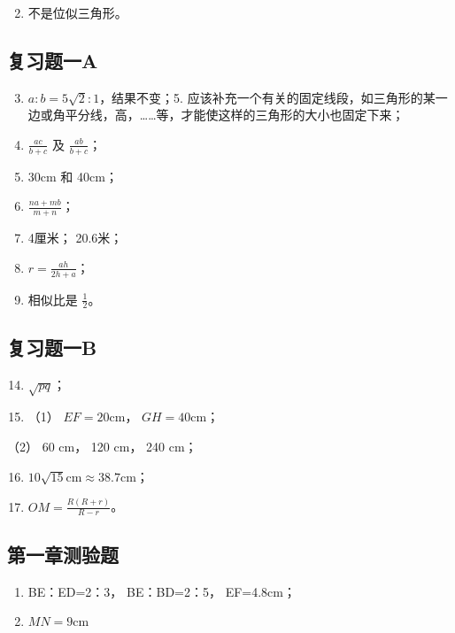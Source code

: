 \begin{enumerate}
\setcounter{enumi}{1}
\item
  不是位似三角形。
\end{enumerate}

\subsection{复习题一A}

\begin{enumerate}
\setcounter{enumi}{2}
\item
  \(a:b = 5\sqrt{2}:1\)，结果不变；5.
  应该补充一个有关的固定线段，如三角形的某一边或角平分线，高，\ldots\ldots 等，才能使这样的三角形的大小也固定下来；
\item
  \(\frac{ac}{b + c}\) 及 \(\frac{ab}{b + c}\)；
\item
  30cm 和 40cm；
\item
  \(\frac{na + mb}{m + n}\)；
\item
  4厘米； 20.6米；
\item
  \(r = \frac{ah}{2h + a}\)；
\item
  相似比是 \(\frac{1}{2}\)。
\end{enumerate}

\subsection{复习题一B}

\begin{enumerate}
\setcounter{enumi}{13}
\item
  \(\sqrt{pq}\)；
\item
  （1） \(EF = 20\mathrm{cm}\)， \(GH = 40\mathrm{cm}\)；
\end{enumerate}

（2） 60 cm， 120 cm， 240 cm；

\begin{enumerate}
\setcounter{enumi}{15}
\item
  \(10\sqrt{15}\mathrm{cm}\approx 38.7\mathrm{cm}\)；
\item
  \(OM = \frac{R(R + r)}{R - r}\)。
\end{enumerate}

\subsection{第一章测验题}

\begin{enumerate}
\item
  BE：ED=2：3， BE：BD=2：5， EF=4.8cm；
\item
  \(MN = 9\mathrm{cm}\)
\end{enumerate}

